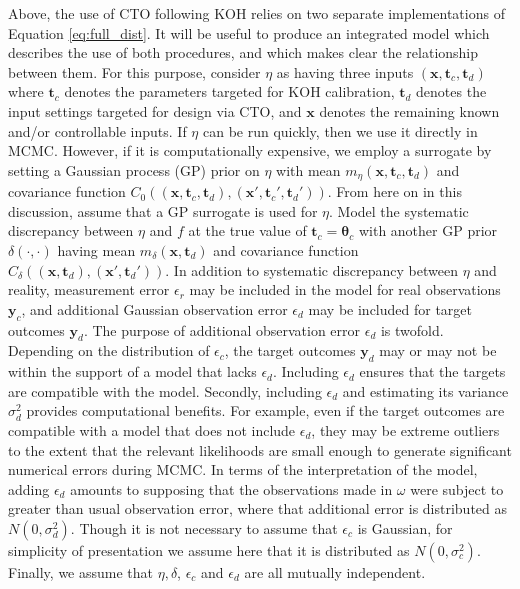 \documentclass[12pt]{article}
\begin{document}
%
Above, the use of CTO following KOH relies on two separate implementations of Equation \eqref{eq:full_dist}.
%
It will be useful to produce an integrated model which describes the use of both procedures, and which makes clear the relationship between them.
%
For this purpose, consider $\eta$ as having three inputs $(\mathbf x,\mathbf t_c,\mathbf t_d)$ where $\mathbf t_c$ denotes the parameters targeted for KOH calibration, $\mathbf t_d$ denotes the input settings targeted for design via CTO, and $\mathbf x$ denotes the remaining known and/or controllable inputs.
%
If $\eta$ can be run quickly, then we use it directly in MCMC.
%
However, if it is computationally expensive, we employ a surrogate by setting a Gaussian process (GP) prior on $\eta$ with mean $m_\eta(\mathbf x,\mathbf t_c,\mathbf t_d)$ and covariance function $C_0((\mathbf x,\mathbf t_c,\mathbf t_d),(\mathbf x',\mathbf t_c',\mathbf t_d'))$.
%
From here on in this discussion, assume that a GP surrogate is used for $\eta$.
%
Model the systematic discrepancy between $\eta$ and $f$ at the true value of $\mathbf t_c=\boldsymbol\theta_c$ with another GP prior $\delta(\cdot,\cdot)$ having mean $m_\delta(\mathbf x,\mathbf t_d)$ and covariance function $C_\delta((\mathbf x,\mathbf t_d),(\mathbf x',\mathbf t_d'))$.
%
In addition to systematic discrepancy between $\eta$ and reality, measurement error $\epsilon_r$ may be included in the model for real observations $\mathbf y_c$, and additional Gaussian observation error $\epsilon_d$ may be included for target outcomes $\mathbf y_d$.
%
The purpose of additional observation error $\epsilon_d$ is twofold.
%
Depending on the distribution of $\epsilon_c$, the target outcomes $\mathbf y_d$ may or may not be within the support of a model that lacks $\epsilon_d$.
%
Including $\epsilon_d$ ensures that the targets are compatible with the model.
%
Secondly, including $\epsilon_d$ and estimating its variance $\sigma_d^2$ provides computational benefits.
%
For example, even if the target outcomes are compatible with a model that does not include $\epsilon_d$, they may be extreme outliers to the extent that the relevant likelihoods are small enough to generate significant numerical errors during MCMC.
%
In terms of the interpretation of the model, adding $\epsilon_d$ amounts to supposing that the observations made in $\omega$ were subject to greater than usual observation error, where that additional error is distributed as $N(0,\sigma_d^2)$.
%
Though it is not necessary to assume that $\epsilon_c$ is Gaussian, for simplicity of presentation we assume here that it is distributed as $N(0,\sigma^2_c)$.
%
Finally, we assume that $\eta,\delta$, $\epsilon_c$ and $\epsilon_d$ are all mutually independent.
%
\end{document}
